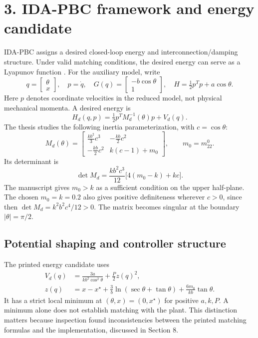 \documentclass[11pt,a4paper]{article}
\newcommand{\reportsection}[1]{\section*{\color{navy}#1}}
\newcommand{\topic}[1]{\subsection*{\color{teal}#1}}
\newcommand{\qref}{x^{\star}}
\begin{document}
\clearpage
\reportsection{3. IDA-PBC framework and energy candidate}
IDA-PBC assigns a desired closed-loop energy and interconnection/damping structure. Under valid matching conditions, the desired energy can serve as a Lyapunov function \cite{ortega,acosta}. For the auxiliary model, write
\[
 q=\begin{bmatrix}\theta\\x\end{bmatrix},\quad
 p=\dot q,\quad
 G(q)=\begin{bmatrix}-b\cos\theta\\1\end{bmatrix},\quad
 H=\tfrac12p^Tp+a\cos\theta.
\]
Here $p$ denotes coordinate velocities in the reduced model, not physical mechanical momenta. A desired energy is
\begin{equation}\label{eq:Hd}
 H_d(q,p)=\tfrac12p^TM_d^{-1}(\theta)p+V_d(q).
\end{equation}
The thesis studies the following inertia parameterization, with $c=\cos\theta$:
\begin{equation}
 M_d(\theta)=\begin{bmatrix}
 \frac{kb^2}{3}c^3&-\frac{kb}{2}c^2\\
 -\frac{kb}{2}c^2&k(c-1)+m_0
 \end{bmatrix},\qquad m_0=m_{22}^0.
\end{equation}
Its determinant is
\begin{equation}
 \det M_d=\frac{kb^2c^3}{12}\big[4(m_0-k)+kc\big].
\end{equation}
The manuscript gives $m_0>k$ as a sufficient condition on the upper half-plane. The chosen $m_0=k=0.2$ also gives positive definiteness wherever $c>0$, since then $\det M_d=k^2b^2c^4/12>0$. The matrix becomes singular at the boundary $\lvert\theta\rvert=\pi/2$.

\topic{Potential shaping and controller structure}
The printed energy candidate uses
\begin{align}
 V_d(q)&=\frac{3a}{kb^2\cos^2\theta}+\frac{P}{2}z(q)^2,\\
 z(q)&=x-\qref+\frac{3}{b}\ln(\sec\theta+\tan\theta)
                 +\frac{6m_0}{kb}\tan\theta.
\end{align}
It has a strict local minimum at $(\theta,x)=(0,\qref)$ for positive $a,k,P$. A minimum alone does not establish matching with the plant. This distinction matters because inspection found inconsistencies between the printed matching formulas and the implementation, discussed in Section 8.
\end{document}
